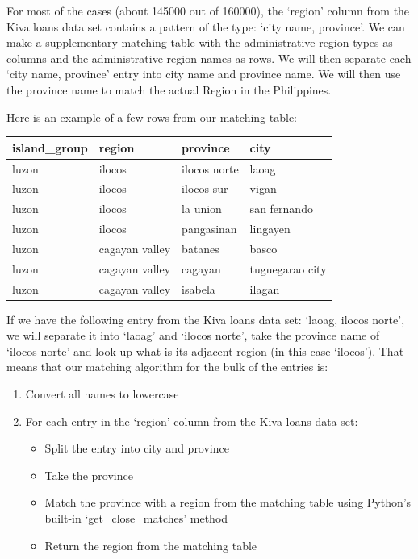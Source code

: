 \documentclass{article}
\begin{document}
For most of the cases (about 145000 out of 160000), the ‘region’ column from the Kiva loans data set contains a pattern of the type: ‘city name, province’. We can make a supplementary matching table with the administrative region types as columns and the administrative region names as rows. We will then separate each ‘city name, province’ entry into city name and province name. We will then use the province name to match the actual Region in the Philippines.

Here is an example of a few rows from our matching table:

\begin{center}
\begin{tabular}{ |l|l|l|l| }
  \hline
  island\_group & region & province & city\\
  \hline
  luzon & ilocos & ilocos norte & laoag\\
  luzon & ilocos & ilocos sur & vigan\\
  luzon & ilocos & la union & san fernando\\
  luzon & ilocos & pangasinan & lingayen\\
  luzon & cagayan valley & batanes & basco\\
  luzon & cagayan valley & cagayan & tuguegarao city\\
  luzon & cagayan valley & isabela & ilagan\\
  \hline
\end{tabular}
\end{center}

If we have the following entry from the Kiva loans data set: ‘laoag, ilocos norte’, we will separate it into ‘laoag’ and ‘ilocos norte’, take the province name of ‘ilocos norte’ and look up what is its adjacent region (in this case ‘ilocos’). That means that our matching algorithm for the bulk of the entries is:

\begin{enumerate}
  \item Convert all names to lowercase
  \item For each entry in the ‘region’ column from the Kiva loans data set:
  \begin{itemize}
    \item Split the entry into city and province
    \item Take the province
    \item Match the province with a region from the matching table using Python’s built-in ‘get\_close\_matches’ method
    \item Return the region from the matching table
  \end{itemize}
\end{enumerate}
\end{document}
